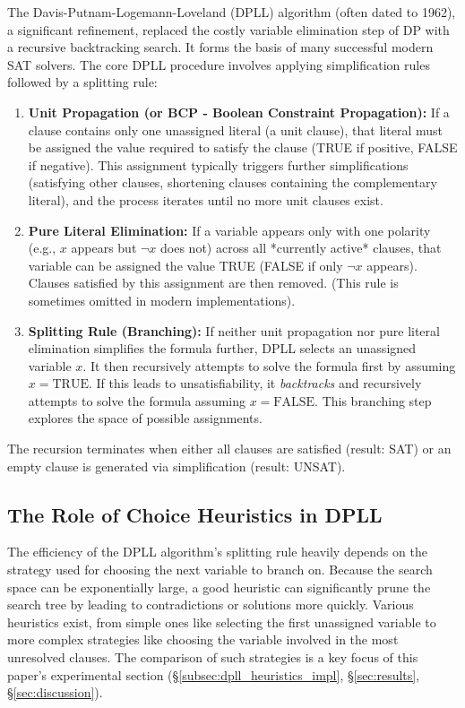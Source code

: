 \documentclass[12pt, a4paper]{article}
\begin{document}
The Davis-Putnam-Logemann-Loveland (DPLL) algorithm (often dated to 1962), a significant refinement, replaced the costly variable elimination step of DP with a recursive backtracking search. It forms the basis of many successful modern SAT solvers. The core DPLL procedure involves applying simplification rules followed by a splitting rule:

\begin{enumerate}
    \item \textbf{Unit Propagation (or BCP - Boolean Constraint Propagation):} If a clause contains only one unassigned literal (a unit clause), that literal must be assigned the value required to satisfy the clause (TRUE if positive, FALSE if negative). This assignment typically triggers further simplifications (satisfying other clauses, shortening clauses containing the complementary literal), and the process iterates until no more unit clauses exist.
    \item \textbf{Pure Literal Elimination:} If a variable appears only with one polarity (e.g., $x$ appears but $\lnot x$ does not) across all *currently active* clauses, that variable can be assigned the value TRUE (FALSE if only $\lnot x$ appears). Clauses satisfied by this assignment are then removed. (This rule is sometimes omitted in modern implementations).
    \item \textbf{Splitting Rule (Branching):} If neither unit propagation nor pure literal elimination simplifies the formula further, DPLL selects an unassigned variable $x$. It then recursively attempts to solve the formula first by assuming $x = \text{TRUE}$. If this leads to unsatisfiability, it \emph{backtracks} and recursively attempts to solve the formula assuming $x = \text{FALSE}$. This branching step explores the space of possible assignments.
\end{enumerate}
The recursion terminates when either all clauses are satisfied (result: SAT) or an empty clause is generated via simplification (result: UNSAT).

\subsection{The Role of Choice Heuristics in DPLL}
\label{subsec:heuristics_intro}

The efficiency of the DPLL algorithm's splitting rule heavily depends on the strategy used for choosing the next variable to branch on. Because the search space can be exponentially large, a good heuristic can significantly prune the search tree by leading to contradictions or solutions more quickly. Various heuristics exist, from simple ones like selecting the first unassigned variable to more complex strategies like choosing the variable involved in the most unresolved clauses. The comparison of such strategies is a key focus of this paper's experimental section (\S\ref{subsec:dpll_heuristics_impl}, \S\ref{sec:results}, \S\ref{sec:discussion}).
\end{document}
